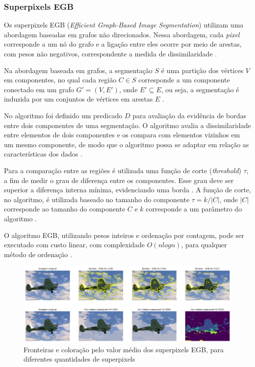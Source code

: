 \begin{document}

\subsubsection{Superpixels EGB} \label{sssec:egb}

Os superpixels EGB (\textit{Efficient Graph-Based Image Segmentation}) utilizam uma abordagem baseadas em grafos não direcionados. Nessa abordagem, cada \textit{pixel} corresponde a um nó do grafo e a ligação entre eles ocorre por meio de arestas, com pesos não negativos, correspondente a medida de dissimilaridade \cite{FELZENSZWALB}. 

Na abordagem baseada em grafos, a segmentação $S$ é uma partição dos vértices $V$ em componentes, no qual cada região $C \in S$ corresponde a um componente conectado em um grafo $G'=(V,E')$, onde $E' \subseteq E$, ou seja, a segmentação é induzida por um conjuntos de vértices em arestas $E$ \cite{FELZENSZWALB}.

No algoritmo foi definido um predicado $D$ para avaliação da evidência de bordas entre dois componentes de uma segmentação. O algoritmo avalia a dissimilaridade entre elementos de dois componentes e os compara com elementos vizinhos em um mesmo componente, de modo que o algoritmo possa se adaptar em relação as características dos dados \cite{FELZENSZWALB}. 

Para a comparação entre as regiões é utilizada uma função de corte (\textit{threshold}) $\tau$, a fim de medir o grau de diferença entre os componentes. Esse grau deve ser superior a diferença interna mínima, evidenciando uma borda \cite{FELZENSZWALB}. A função de corte, no algoritmo, é utilizada baseado no tamanho do componente $\tau=k/|C|$, onde $|C|$ corresponde ao tamanho do componente $C$ e $k$ corresponde a um parâmetro do algoritmo \cite{FELZENSZWALB}.

O algoritmo EGB, utilizando pesos inteiros e ordenação por contagem, pode ser executado com custo linear, com complexidade $O(nlogn)$, para qualquer método de ordenação \cite{FELZENSZWALB}. 

\begin{figure}[ht]
\centering
\includegraphics[width=1.\textwidth]{felz_segmentation_compare.png}
\caption{Fronteiras e coloração pelo valor médio dos superpixels EGB, para diferentes quantidades de superpixels}
\label{fig:EGB}
\end{figure}
\end{document}
